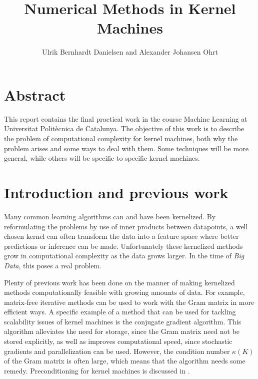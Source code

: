 \documentclass{article}
\title{Numerical Methods in Kernel Machines}
\author{Ulrik Bernhardt Danielsen and Alexander Johansen Ohrt}
\theoremstyle{plain}
\theoremstyle{definition}
\theoremstyle{remark}
\begin{document}
\maketitle

\tableofcontents

\newpage


\section{Abstract}
This report contains the final practical work in the course Machine Learning at Universitat Politècnica de Catalunya.
The objective of this work is to describe the problem of computational complexity for kernel machines, both why the problem arises and some ways to deal with them.
Some techniques will be more general, while others will be specific to specific kernel machines. 



\section{Introduction and previous work}
Many common learning algorithms can and have been kernelized.
By reformulating the problems by use of inner products between datapoints, a well chosen kernel can often transform the data into a feature space where better predictions or inference can be made.
Unfortunately these kernelized methods grow in computational complexity as the data grows larger. In the time of \textit{Big Data}, this poses a real problem.


Plenty of previous work has been done on the manner of making kernelized methods computationally feasible with growing amounts of data. 
For example, matrix-free iterative methods can be used to work with the Gram matrix in more efficient ways. A specific example of a method that can be used for tackling scalability issues of kernel machines is the conjugate gradient algorithm. This algorithm alleviates the need for storage, since the Gram matrix need not be stored explicitly, as well as improves computational speed, since stochastic gradients and parallelization can be used. However, the condition number $\kappa(K)$ of the Gram matrix is often large, which means that the algorithm needs some remedy. Preconditioning for kernel machines is discussed in \cite{cutajar}.
\end{document}
